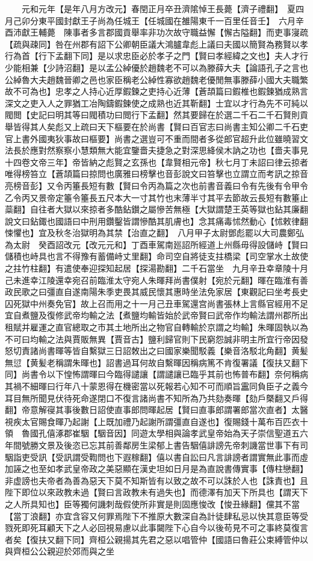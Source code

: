 　　元和元年【是年八月方改元】春閏正月卒丑濟隂悼王長薨【濟子禮翻】　夏四月己卯分東平國封獻王子尚為任城王【任城國在雒陽東千一百里任音壬】　六月辛酉沛獻王輔薨　陳事者多言郡國貢舉率非功次故守職益懈【懈古隘翻】而吏事寖疏【疏與疎同】咎在州郡有詔下公卿朝臣議大鴻臚韋彪上議曰夫國以簡賢為務賢以孝行為首【行下孟翻下同】是以求忠臣必於孝子之門【賢曰孝經緯之文也】夫人才行少能相兼【少詩沼翻】是以孟公綽優於趙魏老不可以為滕薛大夫【論語孔子之言也公綽魯大夫趙魏晉卿之邑也家臣稱老公綽性寡欲趙魏老優閒無事滕薛小國大夫職繁故不可為也】忠孝之人持心近厚鍜鍊之吏持心近薄【蒼頡篇曰鍜椎也鍜鍊猶成熟言深文之吏入人之罪猶工冶陶鑄鍜鍊使之成熟也近其靳翻】士宜以才行為先不可純以閥閲【史記曰明其等曰閥積功曰閲行下孟翻】然其要歸在於選二千石二千石賢則貢舉皆得其人矣彪又上疏曰天下樞要在於尚書【賢曰百官志曰尚書主知公卿二千石吏官上書外國夷狄事故曰樞要】尚書之選豈可不重而間者多從郎官超升此位雖曉習文法長於應對然察察小慧類無大能宜鑒嗇夫捷急之對深思絳侯木訥之功也【嗇夫事見十四卷文帝三年】帝皆納之彪賢之玄孫也【韋賢相元帝】秋七月丁未詔曰律云掠者唯得榜笞立【蒼頡篇曰掠問也廣雅曰榜擊也音彭說文曰笞擊也立謂立而考訊之掠音亮榜音彭】又令丙箠長短有數【賢曰令丙為篇之次也前書音義曰令有先後有令甲令乙令丙又景帝定箠令箠長五尺本大一寸其竹也末薄半寸其平去節故云長短有數箠止蘂翻】自往者大獄以來掠者多酷鉆鑚之屬慘苦無極【大獄謂楚王英等獄也鉆其廉翻說文曰鉆鋷也國語曰中刑用鑽鑿皆謂慘酷其肌膚也】念其痛毒怵然動心【怵敕律翻悚懼也】宜及秋冬治獄明為其禁【治直之翻】　八月甲子太尉鄧彪罷以大司農鄭弘為太尉　癸酉詔改元【改元元和】丁酉車駕南廵詔所經道上州縣毋得設儲峙【賢曰儲積也峙具也言不得豫有蓄備峙丈里翻】命司空自將徒支拄橋梁【司空掌水土故使之拄竹柱翻】有遣使奉迎探知起居【探湯勘翻】二千石當坐　九月辛丑幸章陵十月己未進幸江陵還幸宛召前臨淮太守宛人朱暉拜尚書僕射【宛於元翻】暉在臨淮有善政民歌之曰彊直自遂南陽朱季吏畏其威民懷其惠時坐法免家居【東觀記曰坐考長史囚死獄中州奏免官】故上召而用之十一月己丑車駕還宫尚書張林上言縣官經用不足宜自煮鹽及復修武帝均輸之法【煮鹽均輸皆始於武帝賢曰武帝作均輸法謂州郡所出租賦并雇運之直官總取之市其土地所出之物官自轉輸於京謂之均輸】朱暉固執以為不可曰均輸之法與賈販無異【賈音古】鹽利歸官則下民窮怨誠非明主所宜行帝因發怒切責諸尚書暉等皆自繫獄三日詔敇出之曰國家樂聞駁義【樂音洛駁北角翻】黄髪無愆【黄髪老稱謂朱暉也】詔書過耳何故自繫暉因稱病篤不肯復署議【復扶又翻下同】尚書令以下惶怖謂暉曰今臨得譴讓【謂譴讓已臨乎其前也怖普布翻】奈何稱病其禍不細暉曰行年八十蒙恩得在機密當以死報若心知不可而順旨靁同負臣子之義今耳目無所聞見伏待死命遂閉口不復言諸尚書不知所為乃共劾奏暉【劾戶槩翻又戶得翻】帝意解寑其事後數日詔使直事郎問暉起居【賢曰直事郎謂署郎當次直者】太醫視疾太官賜食暉乃起謝【上既加禮乃起謝所謂彊直自遂也】復賜錢十萬布百匹衣十領　魯國孔僖涿郡崔駰【駰音因】同遊太學相與論孝武皇帝始為天子崇信聖道五六年間號勝文景及後恣已忘其前善鄰房生梁郁上書告駰僖誹謗先帝刺譏當世事下有司駰詣吏受訊【受訊謂受鞫問也下遐稼翻】僖以書自訟曰凡言誹謗者謂實無此事而虛加誣之也至如孝武皇帝政之美惡顯在漢史坦如日月是為直說書傳實事【傳柱戀翻】非虚謗也夫帝者為善為惡天下莫不知斯皆有以致之故不可以誅於人也【誅責也】且陛下即位以來政教未過【賢曰言政教未有過失也】而德澤有加天下所具也【謂天下之人所具知也】臣等獨何譏刺哉假使所非實是則固應悛改【悛丑緣翻】儻其不當【當丁浪翻】亦宜含容又何罪焉陛下不推原大數深自為計徒肆私忌以快其意臣等受戮死即死耳顧天下之人必回視易慮以此事闚陛下心自今以後苟見不可之事終莫復言者矣【復扶又翻下同】齊桓公親揚其先君之惡以唱管仲【國語曰魯莊公束縛管仲以與齊桓公公親迎於郊而與之坐